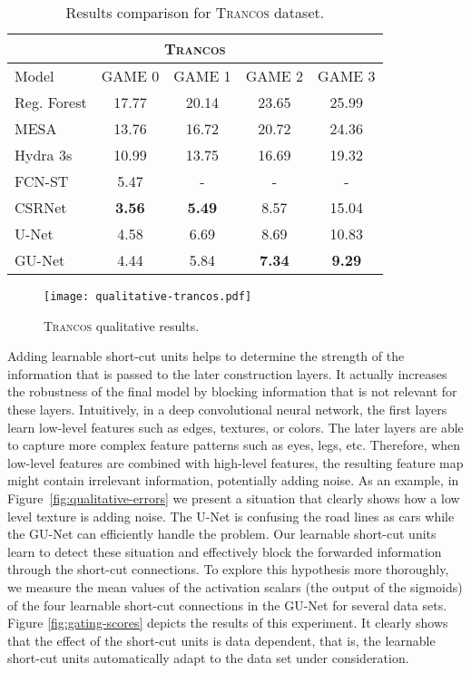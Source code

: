 \documentclass{bmvc2k}
\begin{document}
\begin{table*}[t!]
\small
\centering
\caption{Results comparison for \textsc{Trancos} dataset.}
\label{tab:trancos_art}
\begin{tabular}{|l|c|c|c|c|}
\hline
\multicolumn{5}{c}{\textsc{Trancos}}                                         \\
\hline
\hline
Model                           & GAME 0 & GAME 1 & GAME 2 & GAME 3 \\
\hline
\hline
Reg. Forest\cite{fiaschi2012}   & 17.77  & 20.14  & 23.65  & 25.99  \\
\hline
MESA \cite{lempitsky2010}       & 13.76  & 16.72  & 20.72  & 24.36  \\
\hline
\hline
Hydra 3s \cite{Onoro_2016_ECCV} & 10.99  & 13.75  & 16.69  & 19.32  \\
\hline
FCN-ST \cite{Zhang_2017_CVPR}   & 5.47   & -      & -      & -      \\
\hline
CSRNet \cite{yuhong2018_csrnet} & \textbf{3.56}   & \textbf{5.49}   & 8.57  & 15.04  \\
\hline
\hline
U-Net                           & 4.58   & 6.69   & 8.69   & 10.83  \\
\hline
GU-Net                          & 4.44   & 5.84   & \textbf{7.34}   & \textbf{9.29}   \\
\hline
\end{tabular}
\end{table*}\begin{figure}[t!]
\centering
\texttt{[image: qualitative-trancos.pdf]}
\caption{\label{fig:qualitative-trancos}  \textsc{Trancos} qualitative results.}
\end{figure}Adding learnable short-cut units helps to determine the strength of the information that is passed to the later construction layers. It actually increases the robustness of the final model by blocking information that is not relevant for these layers. Intuitively, in a deep convolutional neural network, the first layers learn low-level features such as edges, textures, or colors. The later layers are able to capture more complex feature patterns such as eyes, legs, etc. Therefore, when low-level features are combined with high-level features, the resulting feature map might contain irrelevant information, potentially adding noise. As an example, in Figure~\ref{fig:qualitative-errors} we present a situation that clearly shows how a low level texture is adding noise. The U-Net is confusing the road lines as cars while the GU-Net can efficiently handle the problem. Our learnable short-cut units learn to detect these situation and effectively block the forwarded information through the short-cut connections. To explore this hypothesis more thoroughly, we measure the mean values of the activation scalars (the output of the sigmoids) of the four learnable short-cut connections in the GU-Net for several data sets. Figure \ref{fig:gating-scores} depicts the results of this experiment. It clearly shows that the effect of the short-cut units is data dependent, that is, the learnable short-cut units automatically adapt to the data set under consideration.
\end{document}
